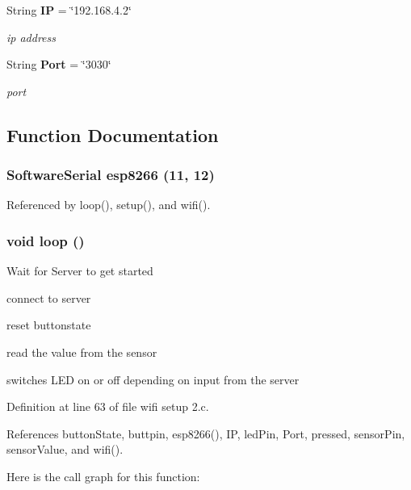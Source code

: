 \begin{CompactItemize}
String {\bf IP} = \char`\"{}192.168.4.2\char`\"{}
\begin{CompactList}\small\item\em ip address \item\end{CompactList}\item 
String {\bf Port} = \char`\"{}3030\char`\"{}
\begin{CompactList}\small\item\em port \item\end{CompactList}\end{CompactItemize}


\subsection{Function Documentation}
\subsubsection{\setlength{\rightskip}{0pt plus 5cm}Software\-Serial esp8266 (11, 12)}\label{wifi_01setup_012_8c_84acb83d0d23cbcd7a6e88593eaabb9b}




Referenced by loop(), setup(), and wifi().
\subsubsection{\setlength{\rightskip}{0pt plus 5cm}void loop ()}\label{wifi_01setup_012_8c_64e0511a8547ef3fad470c7f04ab4b22}


Wait for Server to get started

connect to server

reset buttonstate

read the value from the sensor

switches LED on or off depending on input from the server 

Definition at line 63 of file wifi setup 2.c.

References button\-State, buttpin, esp8266(), IP, led\-Pin, Port, pressed, sensor\-Pin, sensor\-Value, and wifi().

Here is the call graph for this function:
